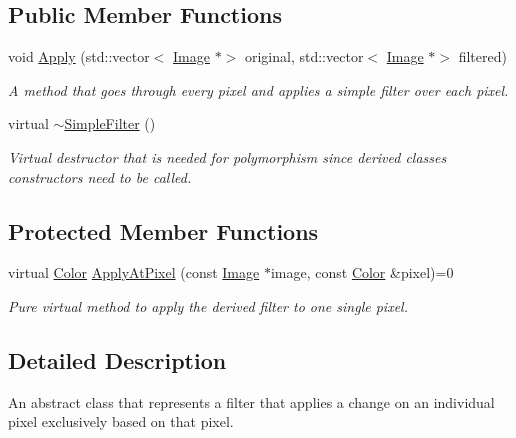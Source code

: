 \subsection*{Public Member Functions}
\begin{DoxyCompactItemize}
\item 
void \hyperlink{classSimpleFilter_a4400a0f97e26e84a33befd537fb4fea8}{Apply} (std\+::vector$<$ \hyperlink{classImage}{Image} $\ast$$>$ original, std\+::vector$<$ \hyperlink{classImage}{Image} $\ast$$>$ filtered)
\begin{DoxyCompactList}\small\item\em A method that goes through every pixel and applies a simple filter over each pixel. \end{DoxyCompactList}\item 
\mbox{\label{classSimpleFilter_a0d1cc3e825db8f8fda3b01ed0e6d64fa}} 
virtual \hyperlink{classSimpleFilter_a0d1cc3e825db8f8fda3b01ed0e6d64fa}{$\sim$\+Simple\+Filter} ()
\begin{DoxyCompactList}\small\item\em Virtual destructor that is needed for polymorphism since derived classes constructors need to be called. \end{DoxyCompactList}\end{DoxyCompactItemize}
\subsection*{Protected Member Functions}
\begin{DoxyCompactItemize}
\item 
virtual \hyperlink{classColor}{Color} \hyperlink{classSimpleFilter_aa12dc75dac8932ce03a9c9a3c7964b30}{Apply\+At\+Pixel} (const \hyperlink{classImage}{Image} $\ast$image, const \hyperlink{classColor}{Color} \&pixel)=0
\begin{DoxyCompactList}\small\item\em Pure virtual method to apply the derived filter to one single pixel. \end{DoxyCompactList}\end{DoxyCompactItemize}


\subsection{Detailed Description}
An abstract class that represents a filter that applies a change on an individual pixel exclusively based on that pixel. 


